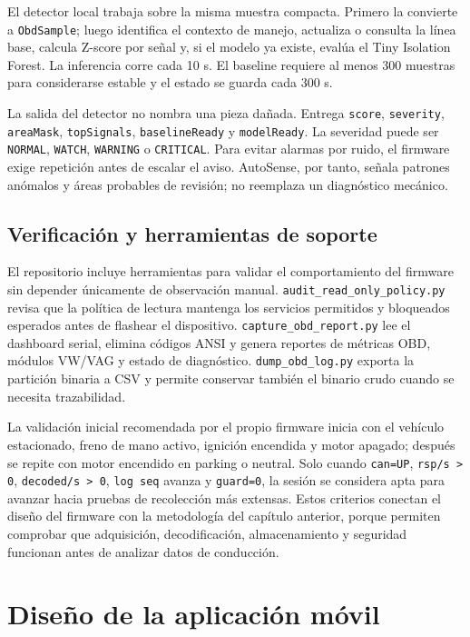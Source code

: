 \documentclass[12pt,letterpaper]{report}
\begin{document}
El detector local trabaja sobre la misma muestra compacta. Primero la convierte a \texttt{ObdSample}; luego identifica el contexto de manejo, actualiza o consulta la línea base, calcula Z-score por señal y, si el modelo ya existe, evalúa el Tiny Isolation Forest. La inferencia corre cada 10 s. El baseline requiere al menos 300 muestras para considerarse estable y el estado se guarda cada 300 s.

La salida del detector no nombra una pieza dañada. Entrega \texttt{score}, \texttt{severity}, \texttt{areaMask}, \texttt{topSignals}, \texttt{baselineReady} y \texttt{modelReady}. La severidad puede ser \texttt{NORMAL}, \texttt{WATCH}, \texttt{WARNING} o \texttt{CRITICAL}. Para evitar alarmas por ruido, el firmware exige repetición antes de escalar el aviso. AutoSense, por tanto, señala patrones anómalos y áreas probables de revisión; no reemplaza un diagnóstico mecánico.

\subsection{Verificación y herramientas de soporte}

El repositorio incluye herramientas para validar el comportamiento del firmware sin depender únicamente de observación manual. \texttt{audit\_read\_only\_policy.py} revisa que la política de lectura mantenga los servicios permitidos y bloqueados esperados antes de flashear el dispositivo. \texttt{capture\_obd\_report.py} lee el dashboard serial, elimina códigos ANSI y genera reportes de métricas OBD, módulos VW/VAG y estado de diagnóstico. \texttt{dump\_obd\_log.py} exporta la partición binaria a CSV y permite conservar también el binario crudo cuando se necesita trazabilidad.

La validación inicial recomendada por el propio firmware inicia con el vehículo estacionado, freno de mano activo, ignición encendida y motor apagado; después se repite con motor encendido en parking o neutral. Solo cuando \texttt{can=UP}, \texttt{rsp/s > 0}, \texttt{decoded/s > 0}, \texttt{log seq} avanza y \texttt{guard=0}, la sesión se considera apta para avanzar hacia pruebas de recolección más extensas. Estos criterios conectan el diseño del firmware con la metodología del capítulo anterior, porque permiten comprobar que adquisición, decodificación, almacenamiento y seguridad funcionan antes de analizar datos de conducción.


\section{Diseño de la aplicación móvil}
\end{document}
